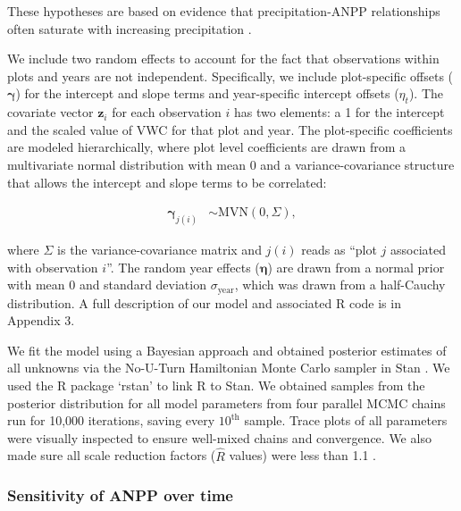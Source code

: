 \documentclass[fleqn,10pt,lineno]{wlpeerj} %
\begin{document}
\noindent{}These hypotheses are based on evidence that
precipitation-ANPP relationships often saturate with increasing
precipitation \citep{Hsu2012, Gherardi2015a}.

We include two random effects to account for the fact that observations
within plots and years are not independent. Specifically, we include
plot-specific offsets (\(\boldsymbol{\gamma}\)) for the intercept and
slope terms and year-specific intercept offsets (\(\eta_t\)). The
covariate vector \(\textbf{z}_i\) for each observation \(i\) has two
elements: a 1 for the intercept and the scaled value of VWC for that
plot and year. The plot-specific coefficients are modeled
hierarchically, where plot level coefficients are drawn from a
multivariate normal distribution with mean 0 and a variance-covariance
structure that allows the intercept and slope terms to be correlated:

\vspace{-1em}

\begin{align}
\boldsymbol{\gamma}_{j(i)} &\sim \text{MVN} \left( 0, \Sigma  \right),
\end{align}

\noindent{}where \(\Sigma\) is the variance-covariance matrix and
\(j(i)\) reads as ``plot \(j\) associated with observation \(i\)''. The
random year effects (\(\boldsymbol{\eta}\)) are drawn from a normal
prior with mean 0 and standard deviation \(\sigma_{\text{year}}\), which
was drawn from a half-Cauchy distribution.
A full description of our model and associated R \citep{R2016} code is
in Appendix 3.

We fit the model using a Bayesian approach and obtained posterior
estimates of all unknowns via the No-U-Turn Hamiltonian Monte Carlo
sampler in Stan \citep{stan2016}. We used the R package `rstan'
\citep{rstan2016} to link R \citep{R2016} to Stan. We obtained samples
from the posterior distribution for all model parameters from four
parallel MCMC chains run for 10,000 iterations, saving every
\(10^{\text{th}}\) sample. Trace plots of all parameters were visually
inspected to ensure well-mixed chains and convergence. We also made sure
all scale reduction factors (\(\hat{R}\) values) were less than 1.1
\citep{Gelman2009}.

\subsubsection{Sensitivity of ANPP over
time}\label{sensitivity-of-anpp-over-time}
\end{document}
